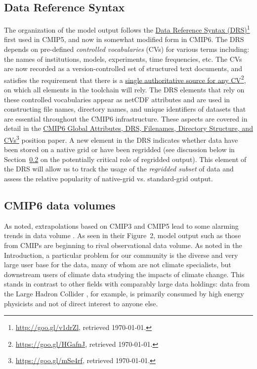 \documentclass[gmd,manuscript]{copernicus}
\newcommand{\urlref}[2] {\href{#1}{#2}\footnote{\url{#1}, retrieved \today.}}
\begin{document}
\subsection{Data Reference Syntax}
\label{sec:data-drs}

The organization of the model output follows the
\urlref{http://goo.gl/v1drZl}{Data Reference Syntax (DRS)} first used
in CMIP5, and now in somewhat modified form in CMIP6. The DRS depends
on pre-defined \emph{controlled vocabularies} (CVs) for various terms
including: the names of institutions, models, experiments, time
frequencies, etc. The CVs are now recorded as a version-controlled set
of structured text documents, and satisfies the requirement that there
is a \urlref{https://goo.gl/HGafnJ}{single authoritative source for
  any CV}, on which all elements in the toolchain will rely. The DRS
elements that rely on these controlled vocabularies appear as netCDF
attributes and are used in constructing file names, directory names,
and unique identifiers of datasets that are essential throughout the
CMIP6 infrastructure. These aspects are covered in detail in the
\urlref{https://goo.gl/mSe4rf}{CMIP6 Global Attributes, DRS,
  Filenames, Directory Structure, and CVs} position paper. A new
element in the DRS indicates whether data have been stored on a native
grid or have been regridded (see discussion below in
Section~\ref{sec:dvol} on the potentially critical role of regridded
output). This element of the DRS will allow us to track the usage of
the \emph{regridded subset} of data and assess the relative
popularity of native-grid vs. standard-grid output.

\subsection{CMIP6 data volumes}
\label{sec:dvol}

As noted, extrapolations based on CMIP3 and CMIP5 lead to some
alarming trends in data volume \citep[see
e.g.,][]{ref:overpecketal2011}.
As seen in their Figure~2, model output such as those from CMIPs are
beginning to rival observational data volume. As noted in the
Introduction, a particular problem for our community is the diverse
and very large user base for the data, many of whom are not climate
specialists, but downstream users of climate data studying the impacts
of climate change. This stands in contrast to other fields with
comparably large data holdings: data from the Large Hadron Collider
\citep[e.g.,][]{ref:aadetal2008}, for example, is primarily consumed by
high energy physicists and not of direct interest to anyone else.
\end{document}
